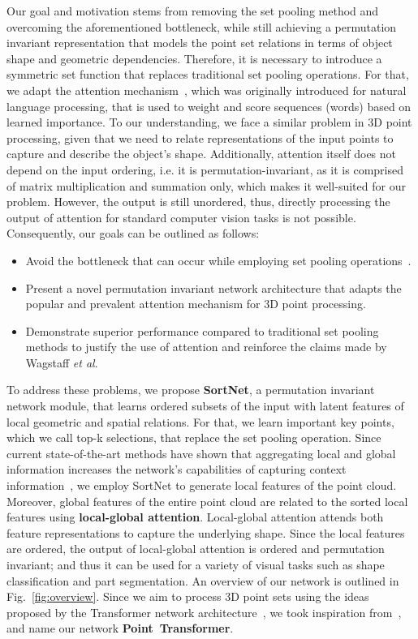\documentclass{ieeeaccess}
\begin{document}
Our goal and motivation stems from removing the set pooling method and overcoming the aforementioned bottleneck, while still achieving a permutation invariant representation that models the point set relations in terms of object shape and geometric dependencies. Therefore, it is necessary to introduce a symmetric set function that replaces traditional set pooling operations. For that, we adapt the attention mechanism~\cite{bahdanau2014neural}, which was originally introduced for natural language processing, that is used to weight and score sequences (words) based on learned importance.
To our understanding, we face a similar problem in 3D point processing, given that we need to relate representations of the input points to capture and describe the object's shape. Additionally, attention itself does not depend on the input ordering, i.e. it is permutation-invariant,  as it is comprised of matrix multiplication and summation only, which makes it well-suited for our problem. However, the output is still unordered, thus, directly processing the output of attention for standard computer vision tasks is not possible. 
Consequently, our goals can be outlined as follows: 
\begin{itemize}
    \item Avoid the bottleneck that can occur while employing set pooling operations~\cite{wagstaff2019limitations}. 
    \item Present a novel permutation invariant network architecture that adapts the popular and prevalent attention mechanism for 3D point processing.
    \item Demonstrate superior performance compared to traditional set pooling methods to justify the use of attention and reinforce the claims made by Wagstaff \textit{et al}.
\end{itemize}

To address these problems, we propose \textbf{SortNet}, a permutation invariant network module, that learns ordered subsets of the input with latent features of local geometric and spatial relations. For that, we learn important key points, which we call top-k selections, that replace the set pooling operation.
Since current state-of-the-art methods have shown that aggregating local and global information increases the network's capabilities of capturing context information~\cite{qi2017pointnet++,liu2019point2sequence,li2018so}, we employ SortNet to generate local features of the point cloud. Moreover, global features of the entire point cloud are related to the sorted local features using \textbf{local-global attention}. Local-global attention attends both feature representations to capture the underlying shape. Since the local features are ordered, the output of local-global attention is ordered and permutation invariant; and thus it can be used for a variety of visual tasks such as shape classification and part segmentation. An overview of our network is outlined in Fig.~\ref{fig:overview}. Since we aim to process 3D point sets using the ideas proposed by the Transformer network architecture~\cite{vaswani2017attention}, we took inspiration from~\cite{lee2019set}, and name our network \mbox{\textbf{Point Transformer}.}
\end{document}

